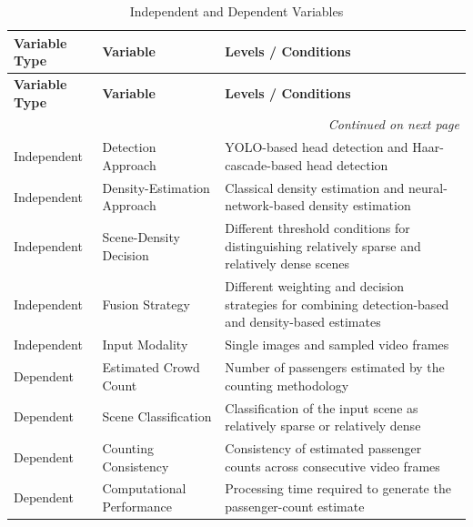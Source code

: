 \documentclass[12pt,a4paper]{report}
\begin{document}
\begin{longtable}{|p{}|p{}|p{}|}
\caption{Independent and Dependent Variables}
\label{tab:experimental-variables}\\
\hline

\textbf{Variable Type} &
\textbf{Variable} &
\textbf{Levels / Conditions} \\

\hline
\endfirsthead

\hline

\textbf{Variable Type} &
\textbf{Variable} &
\textbf{Levels / Conditions} \\

\hline
\endhead

\hline
\multicolumn{3}{r}{\textit{Continued on next page}}\\
\endfoot

\hline
\endlastfoot

Independent &
Detection Approach &
YOLO-based head detection and Haar-cascade-based head detection \\

\hline

Independent &
Density-Estimation Approach &
Classical density estimation and neural-network-based density estimation \\

\hline

Independent &
Scene-Density Decision &
Different threshold conditions for distinguishing relatively sparse and
relatively dense scenes \\

\hline

Independent &
Fusion Strategy &
Different weighting and decision strategies for combining detection-based
and density-based estimates \\

\hline

Independent &
Input Modality &
Single images and sampled video frames \\

\hline

Dependent &
Estimated Crowd Count &
Number of passengers estimated by the counting methodology \\

\hline

Dependent &
Scene Classification &
Classification of the input scene as relatively sparse or relatively dense \\

\hline

Dependent &
Counting Consistency &
Consistency of estimated passenger counts across consecutive video frames \\

\hline

Dependent &
Computational Performance &
Processing time required to generate the passenger-count estimate \\

\hline

\end{longtable}
\end{document}

